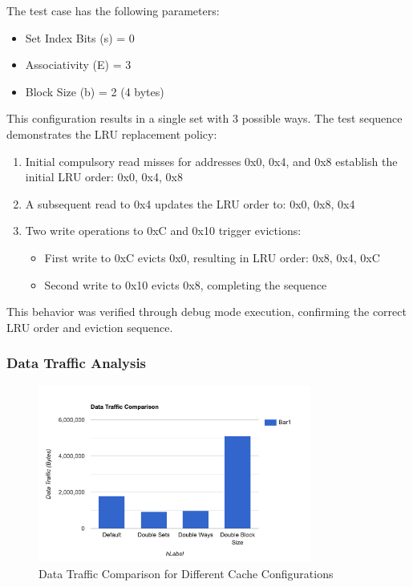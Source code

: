\documentclass[10pt]{article}
\begin{document}
The test case has the following parameters:
\begin{itemize}
    \item Set Index Bits (s) = 0
    \item Associativity (E) = 3
    \item Block Size (b) = 2 (4 bytes)
\end{itemize}

This configuration results in a single set with 3 possible ways. The test sequence demonstrates the LRU replacement policy:

\begin{enumerate}
    \item Initial compulsory read misses for addresses 0x0, 0x4, and 0x8 establish the initial LRU order: 0x0, 0x4, 0x8
    \item A subsequent read to 0x4 updates the LRU order to: 0x0, 0x8, 0x4
    \item Two write operations to 0xC and 0x10 trigger evictions:
    \begin{itemize}
        \item First write to 0xC evicts 0x0, resulting in LRU order: 0x8, 0x4, 0xC
        \item Second write to 0x10 evicts 0x8, completing the sequence
    \end{itemize}
\end{enumerate}

This behavior was verified through debug mode execution, confirming the correct LRU order and eviction sequence.

\subsubsection{Data Traffic Analysis}
\begin{figure}[H]
    \centering
    \includegraphics[width=0.8\textwidth]{./images/data_traffic.png}
    \caption{Data Traffic Comparison for Different Cache Configurations}
\end{figure}
\end{document}
